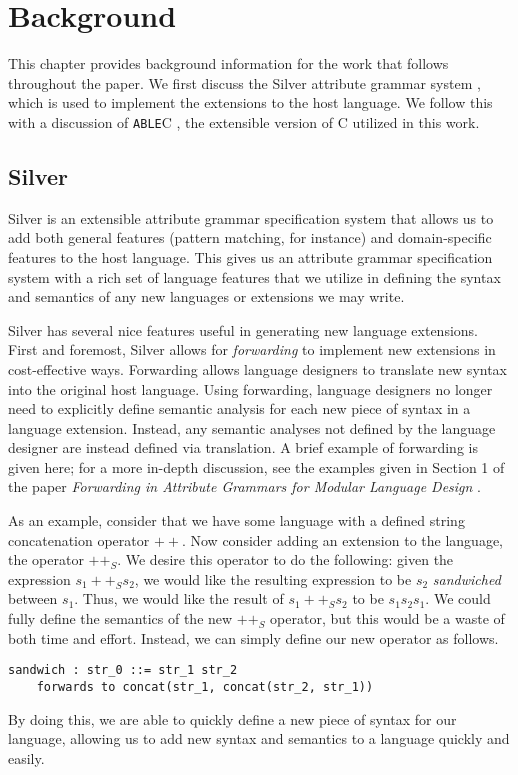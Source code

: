 \documentclass[main.tex]{subfiles}
\begin{document}
\section{Background}

This chapter provides background information for the work that follows
throughout the paper. We first discuss the Silver attribute grammar system 
\cite{3}, which is used to implement the extensions to the host language.
We follow this with a discussion of \verb|ABLE|C \cite{8}, the extensible
version of C utilized in this work.

\subsection{Silver}
Silver \cite{3} is an extensible attribute grammar specification system that allows us to 
add both general features (pattern matching, for instance) and domain-specific features
to the host language. This gives us an attribute grammar specification system with a rich
set of language features that we utilize in defining the syntax and semantics of any new 
languages or extensions we may write.

Silver has several nice features useful in generating new language extensions.
First and foremost, Silver allows for \emph{forwarding} \cite{4} to 
implement new extensions in cost-effective ways. Forwarding allows language
designers to translate new syntax into the original host language. Using forwarding,
language designers no longer need to explicitly define semantic analysis for each new
piece of syntax in a language extension. Instead, any semantic analyses not defined
by the language designer are instead defined via translation. A brief example of forwarding is 
given here; for a more in-depth discussion, see the examples given in Section 1 of the paper 
\emph{Forwarding in Attribute Grammars for Modular Language Design} \cite{4}.

As an example, consider that we have some language with a defined string concatenation operator $++$.
Now consider adding an extension to the language, the operator $++_S$. We desire this operator to do
the following: given the expression $s_1 ++_S s_2$, we would like the resulting expression to be $s_2$
\emph{sandwiched} between $s_1$. Thus, we would like the result of $s_1 ++_S s_2$ to be $s_1 s_2 s_1$.
We could fully define the semantics of the new $++_S$ operator, but this would be a waste of both time and
effort. Instead, we can simply define our new operator as follows.
\begin{lstlisting}
sandwich : str_0 ::= str_1 str_2
	forwards to concat(str_1, concat(str_2, str_1))
\end{lstlisting}
By doing this, we are able to quickly define a new piece of syntax for our language, allowing us to add new
syntax and semantics to a language quickly and easily.
\end{document}
